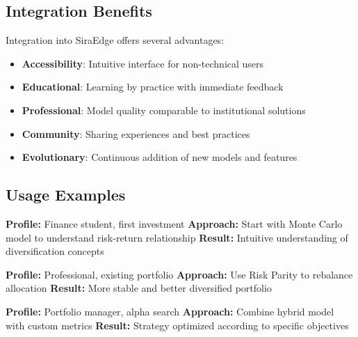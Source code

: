 \documentclass[11pt,a4paper]{article}
\begin{document}
\subsection{Integration Benefits}
Integration into SiraEdge offers several advantages:

\begin{itemize}
\item \textbf{Accessibility}: Intuitive interface for non-technical users
\item \textbf{Educational}: Learning by practice with immediate feedback
\item \textbf{Professional}: Model quality comparable to institutional solutions
\item \textbf{Community}: Sharing experiences and best practices
\item \textbf{Evolutionary}: Continuous addition of new models and features
\end{itemize}

\subsection{Usage Examples}
\begin{tcolorbox}[title=Example 1 - Beginner Investor]
\textbf{Profile:} Finance student, first investment
\textbf{Approach:} Start with Monte Carlo model to understand risk-return relationship
\textbf{Result:} Intuitive understanding of diversification concepts
\end{tcolorbox}

\begin{tcolorbox}[title=Example 2 - Intermediate Investor]
\textbf{Profile:} Professional, existing portfolio
\textbf{Approach:} Use Risk Parity to rebalance allocation
\textbf{Result:} More stable and better diversified portfolio
\end{tcolorbox}

\begin{tcolorbox}[title=Example 3 - Advanced Investor]
\textbf{Profile:} Portfolio manager, alpha search
\textbf{Approach:} Combine hybrid model with custom metrics
\textbf{Result:} Strategy optimized according to specific objectives
\end{tcolorbox}
\end{document}
